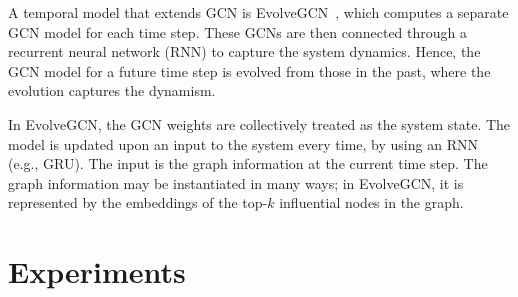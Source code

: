 \documentclass[sigconf,submission]{acmart}
\begin{document}
A temporal model that extends GCN is EvolveGCN~\cite{Pareja2019}, which computes a separate GCN model for each time step. These GCNs are then connected through a recurrent neural network (RNN) to capture the system dynamics. Hence, the GCN model for a future time step is evolved from those in the past, where the evolution captures the dynamism.

In EvolveGCN, the GCN weights are collectively treated as the system state. The model is updated upon an input to the system every time, by using an RNN (e.g., GRU). The input is the graph information at the current time step. The graph information may be instantiated in many ways; in EvolveGCN, it is represented by the embeddings of the top-$k$ influential nodes in the graph.

\section{Experiments}
\end{document}
